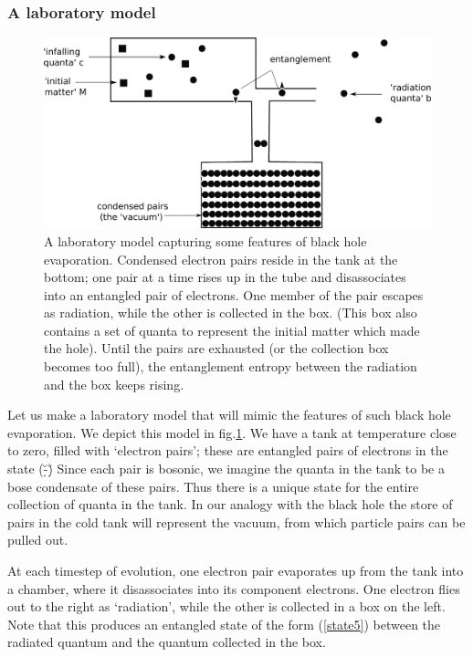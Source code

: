 \documentclass[12pt]{article}
\begin{document}
\subsubsection{A laboratory model}


\begin{figure}[htbp]
\begin{center}
\includegraphics[scale=.25]{fn3.eps}
\caption{{A laboratory model capturing some features of black hole evaporation. Condensed electron pairs reside in the tank at the bottom; one pair at a time rises up in the tube and disassociates into an entangled pair of electrons. One member of the pair escapes as radiation, while the other is collected in the box. (This box also contains a set of quanta to represent the initial matter which made the hole). Until the pairs are exhausted (or the collection box becomes too full), the entanglement entropy between the radiation and the box keeps rising.}}
\label{fn3}
\end{center}
\end{figure}


Let us make a laboratory model that will mimic the features of such black hole evaporation. We depict this model in fig.\ref{fn3}. We have a tank at temperature close to zero, filled with `electron pairs'; these are entangled pairs of electrons in the state
\be
\sq(\u\d-\d\u)
\label{state5}
\ee
Since each pair is bosonic, we imagine the quanta in the tank to be a bose condensate of these pairs. Thus there is a unique state for the entire collection of quanta in the tank. In our analogy with the black hole
the store of pairs in the cold tank will represent the vacuum, from which particle pairs can be pulled out.

At each timestep of evolution, one electron pair  evaporates up from the tank into a chamber, where it disassociates into its component electrons. One electron flies out to the right as `radiation', while the other is collected in a box on the left. Note that this produces an entangled state of the form (\ref{state5}) between the radiated quantum and the quantum collected in the box. 
\end{document}

